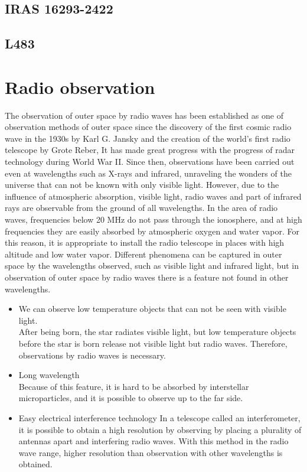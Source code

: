 \subsection{IRAS 16293-2422}


\subsection{L483}

\newpage
\section{Radio observation}
The observation of outer space by radio waves has been established as one of observation methods of outer space since the discovery of the first cosmic radio wave in the 1930s by Karl G. Jansky and the creation of the world's first radio telescope by Grote Reber, It has made great progress with the progress of radar technology during World War II. Since then, observations have been carried out even at wavelengths such as X-rays and infrared, unraveling the wonders of the universe that can not be known with only visible light. However, due to the influence of atmospheric absorption, visible light, radio waves and part of infrared rays are observable from the ground of all wavelengths. In the area of radio waves, frequencies below 20 MHz do not pass through the ionosphere, and at high frequencies they are easily absorbed by atmospheric oxygen and water vapor. For this reason, it is appropriate to install the radio telescope in places with high altitude and low water vapor. Different phenomena can be captured in outer space by the wavelengths observed, such as visible light and infrared light, but in observation of outer space by radio waves there is a feature not found in other wavelengths.

\begin{itemize}
\item We can observe low temperature objects that can not be seen with visible light.\\
After being born, the star radiates visible light, but low temperature objects before the star is born 
release not visible light but radio waves. Therefore, observations by radio waves is necessary.

\item Long wavelength\\
Because of this feature, it is hard to be absorbed by interstellar microparticles, and it is possible to observe up to the far side.

\item Easy electrical interference technology
In a telescope called an interferometer, it is possible to obtain a high resolution by observing by placing a plurality of antennas apart and interfering radio waves. With this method in the radio wave range, higher resolution than observation with other wavelengths is obtained.
\end{itemize}


